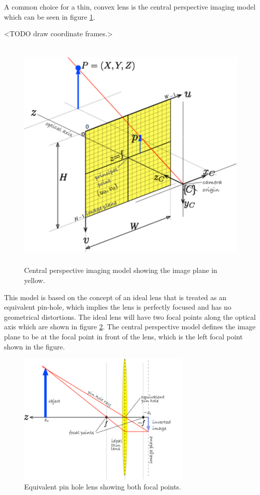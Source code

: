  A common choice for a thin, convex lens is the central perspective imaging model which can be seen in figure \ref{projection_model}. \
 
<TODO draw coordinate frames.>
 
\begin{figure}[htb]
	\centering
    \includegraphics[height=4.5in]{figures/projection_model.png}
    \caption[Projection model]{Central perspective imaging model showing the image plane in yellow.}
    \label{projection_model}
\end{figure}
 
 This model is based on the concept of an ideal lens that is treated as an equivalent pin-hole, which implies the lens is perfectly focused and has no geometrical distortions.  The ideal lens will have two focal points along the optical axis which are shown in figure \ref{focal_points}.  The central perspective model defines the image plane to be at the focal point in front of the lens, which is the left focal point shown in the figure.  

\begin{figure}[htb]
	\centering
    \includegraphics[height=2.5in]{figures/projections_two_focal.png}
    \caption[Focal points]{Equivalent pin hole lens showing both focal points.}
    \label{focal_points}
\end{figure} 

